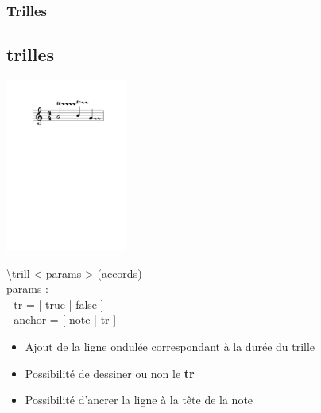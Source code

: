 \documentclass[12pt]{beamer}
\newenvironment{code}
  {\fontfamily{prc}\selectfont}{}
\begin{document}
    \begin{frame}
    \frametitle{Trilles}
    \subsection{trilles}
    
    \begin{center} \includegraphics[width=4cm]{img/trill2.pdf} \end{center}
    
    \begin{code} \textbackslash{}trill \textless{} params \textgreater{} (accords)\\ 
    \hspace{2mm} params :\\
      - tr = [ true | false ]\\
      - anchor  = [ note | tr ]
    \end{code}
    
    \vspace{5mm}
    
    \begin{itemize}
      \item Ajout de la ligne ondulée correspondant à la durée du trille
      \item Possibilité de dessiner ou non le \textbf{tr}
      \item Possibilité d'ancrer la ligne à la tête de la note
    \end{itemize}
    
    \end{frame}
\end{document}

